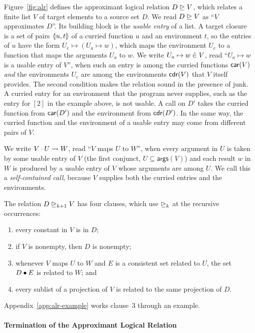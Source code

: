 Figure~\ref{fig:alr} defines the approximant logical relation
$D \mathrel{\trianglerighteq} V$, which relates a finite list $V$ of target elements to a
source set $D$. We read $D \mathrel{\trianglerighteq} V$ as ``$V$ approximates $D$''. Its building block is the \emph{usable entry} of a
list. A target closure is a set of pairs $\langle\!|u,t|\!\rangle$ of a curried
function $u$ and an environment $t$, so the entries of $u$ have
the form $U_e \mapsto (U_a \mapsto w)$, which maps the environment $U_e$
to a function that maps the arguments $U_a$ to $w$. We write
$U_a \mapsto w \mathrel{\dot{\in}} V$, read ``$U_a \mapsto w$ is a usable entry of
$V$'', when such an entry is among the curried functions $\mathsf{car}(V)$
\emph{and} the environments $U_e$ are among the environments
$\mathsf{cdr}(V)$ that $V$ itself provides. The second condition makes the
relation sound in the presence of junk. A curried entry for an environment
that the program never supplies, such as the entry for $[2]$ in the
example above, is not usable. A call on $D'$ takes the curried function from $\mathsf{car}(D')$ and the environment
from $\mathsf{cdr}(D')$. In the same way,
the curried function and the environment of a usable entry may come from different
pairs of $V$.

We write $V \cdot U \leadsto W$, read ``$V$ maps $U$ to $W$'', when
every argument in $U$ is taken by some usable entry of $V$ (the first
conjunct, $U \subseteq \mathsf{args}(V)$) and each result $w$ in $W$
is produced by a usable entry of $V$ whose arguments are among $U$. We
call this a \emph{self-contained call}, because $V$ supplies both the
curried entries and the environments.

The relation $D \mathrel{\trianglerighteq}_{k+1} V$ has four clauses, which use ${\mathrel{\trianglerighteq}_k}$
at the recursive occurrences:
\begin{enumerate}
  \item every constant in $V$ is in $D$;
  \item if $V$ is nonempty, then $D$ is nonempty;
  \item whenever $V$ maps $U$ to $W$ and $E$ is a consistent set
    related to $U$, the set $D \mathbin{\bullet} E$ is related to $W$; and
  \item every sublist of a projection of $V$ is related to the same
    projection of $D$.
\end{enumerate}
Appendix~\ref{app:alr-example} works clause~3 through an example.



\paragraph{Termination of the Approximant Logical Relation}

